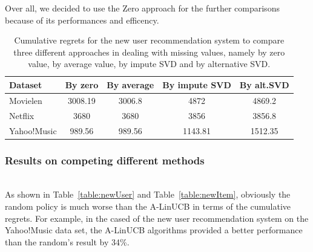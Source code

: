 \documentclass[twoside,leqno,twocolumn]{article}
\begin{document}
Over all, we decided to use the Zero approach for the further comparisons because of its performances and efficency.
\begin{table}
  \caption{Cumulative regrets for the new user recommendation system to compare three different approaches in dealing with missing values, namely by zero value, by average value, by impute SVD and by alternative SVD.}
  \centering
  \begin{tabular}{|l|c|c|c|c|}
    \hline
    Dataset & By zero & By average & By impute SVD & By alt.SVD\\
    \hline
    Movielen & 3008.19 & 3006.8 & 4872 & 4869.2\\
    \hline
    Netflix & 3680 & 3680 & 3856 & 3856.8\\
    \hline  
    Yahoo!Music & 989.56 & 989.56 & 1143.81 & 1512.35\\
    \hline
  \end{tabular}
  \label{table:missingValuePerformance}
\end{table}

\subsubsection{Results on competing different methods}
~\\
As shown in Table~\ref{table:newUser} and Table~\ref{table:newItem}, obviously the random policy is much worse than the A-LinUCB in terms of the cumulative regrets. For example, in the cased of the new user recommendation system on the Yahoo!Music data set, the A-LinUCB algorithms provided a better performance than the random's result by 34\%.
\end{document}
